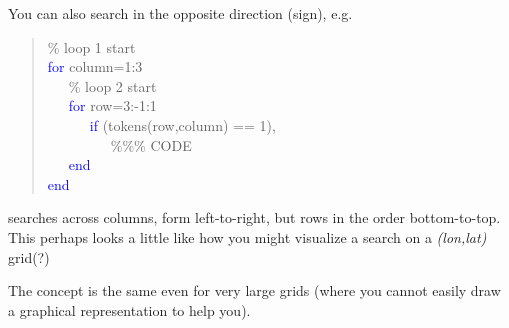 \documentclass{tufte-book} %
\newenvironment{docspec}{\begin{quotation}\ttfamily\parskip0pt\parindent0pt\ignorespaces}{\end{quotation}}
\begin{document}
You can also search in the opposite direction (sign), e.g.
\begin{docspec}
\textcolor[rgb]{0,0.501961,0}{\% loop 1 start\\}
\textcolor{blue}{for} column=1:3\\
\ \ \ \textcolor[rgb]{0,0.501961,0}{\% loop 2 start\\}
\ \ \ \textcolor{blue}{for} row=3:-1:1\\
\ \ \ \ \ \ \textcolor{blue}{if} (tokens(row,column) == 1),\\
\ \ \ \ \ \ \ \ \ \textcolor[rgb]{0,0.501961,0}{\%\%\% CODE}\\
\ \ \ \textcolor{blue}{end}\\
\textcolor{blue}{end}
\end{docspec}
searches across columns, form left-to-right, but rows in the order bottom-to-top. This perhaps looks a little like how you might visualize a search on a \textit{(lon,lat)} grid(?)

The concept is the same even for very large grids (where you cannot easily draw a graphical representation to help you).
\end{document}

